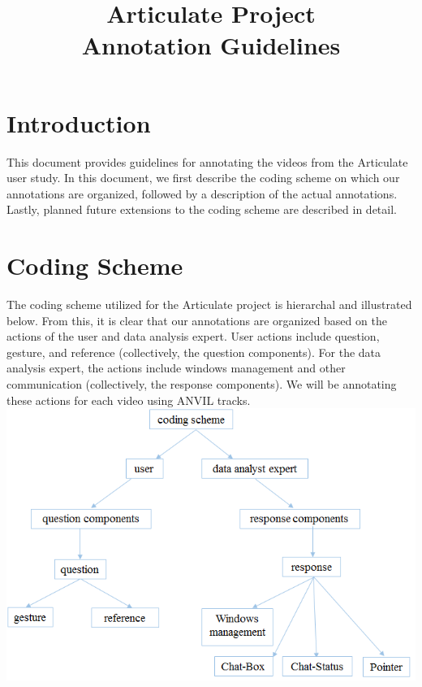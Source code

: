 \documentclass[]{article}
\title{Articulate Project \\ Annotation Guidelines}
\author{}
\begin{document}
\maketitle

\section{Introduction}
This document provides guidelines for annotating the videos from the Articulate user study. In this document, we first describe the coding scheme on which our annotations are organized, followed by a description of the actual annotations. Lastly, planned future extensions to the coding scheme are described in detail.

\section{Coding Scheme}
The coding scheme utilized for the Articulate project is hierarchal and illustrated below. From this, it is clear that our annotations are organized based on the actions of the user and data analysis expert. User actions include question, gesture, and reference (collectively, the question components). For the data analysis expert, the actions include windows management and other communication (collectively, the response components). We will be annotating these actions for each video using ANVIL tracks. \\
\includegraphics[width=1.0\textwidth]{coding_scheme.png}
\end{document}
